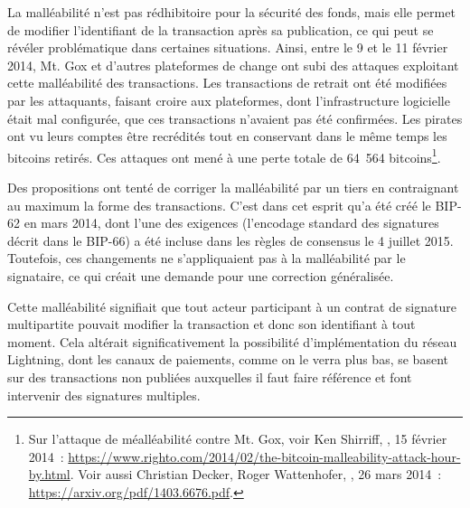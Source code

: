 La malléabilité n'est pas rédhibitoire pour la sécurité des fonds, mais elle permet de modifier l'identifiant de la transaction après sa publication, ce qui peut se révéler problématique dans certaines situations. Ainsi, entre le 9 et le 11 février 2014, Mt. Gox et d'autres plateformes de change ont subi des attaques exploitant cette malléabilité des transactions. Les transactions de retrait ont été modifiées par les attaquants, faisant croire aux plateformes, dont l'infrastructure logicielle était mal configurée, que ces transactions n'avaient pas été confirmées. Les pirates ont vu leurs comptes être recrédités tout en conservant dans le même temps les bitcoins retirés. Ces attaques ont mené à une perte totale de 64~564 bitcoins\footnote{Sur l'attaque de méalléabilité contre Mt. Gox, voir Ken Shirriff, , 15 février 2014~: \url{https://www.righto.com/2014/02/the-bitcoin-malleability-attack-hour-by.html}. Voir aussi Christian Decker, Roger Wattenhofer, , 26 mars 2014~: \url{https://arxiv.org/pdf/1403.6676.pdf}.}. %

Des propositions ont tenté de corriger la malléabilité par un tiers en contraignant au maximum la forme des transactions. C'est dans cet esprit qu'a été créé le BIP-62 en mars 2014, dont l'une des exigences (l'encodage standard des signatures décrit dans le BIP-66) a été incluse dans les règles de consensus le 4 juillet 2015. Toutefois, ces changements ne s'appliquaient pas à la malléabilité par le signataire, ce qui créait une demande pour une correction généralisée.

Cette malléabilité signifiait que tout acteur participant à un contrat de signature multipartite pouvait modifier la transaction et donc son identifiant à tout moment. Cela altérait significativement la possibilité d'implémentation du réseau Lightning, dont les canaux de paiements, comme on le verra plus bas, se basent sur des transactions non publiées auxquelles il faut faire référence et font intervenir des signatures multiples.

